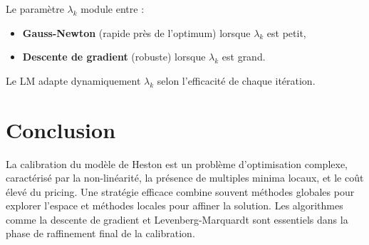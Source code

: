 Le paramètre $\lambda_k$ module entre :
\begin{itemize}
	\item \textbf{Gauss-Newton} (rapide près de l'optimum) lorsque $\lambda_k$ est petit,
	\item \textbf{Descente de gradient} (robuste) lorsque $\lambda_k$ est grand.
\end{itemize}

Le LM adapte dynamiquement $\lambda_k$ selon l'efficacité de chaque itération.

\section{Conclusion}

La calibration du modèle de Heston est un problème d'optimisation complexe, caractérisé par la non-linéarité, la présence de multiples minima locaux, et le coût élevé du pricing. Une stratégie efficace combine souvent méthodes globales pour explorer l'espace et méthodes locales pour affiner la solution. Les algorithmes comme la descente de gradient et Levenberg-Marquardt sont essentiels dans la phase de raffinement final de la calibration.
